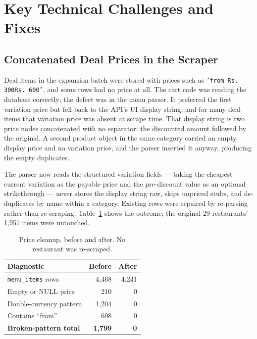 \documentclass[11pt,a4paper]{article}
\newcommand{\code}[1]{\texttt{\small #1}}
\begin{document}
\section{Key Technical Challenges and Fixes}

\subsection{Concatenated Deal Prices in the Scraper}
\label{sec:dealbug}

Deal items in the expansion batch were stored with prices such as
\code{'from Rs. 300Rs. 600'}, and some rows had no price at all. The cart code
was reading the database correctly; the defect was in the menu parser. It
preferred the first variation price but fell back to the API's UI display
string, and for many deal items that variation price was absent at scrape
time. That display string is two price nodes concatenated with no separator:
the discounted amount followed by the original. A second product object in the
same category carried an empty display price and no variation price, and the
parser inserted it anyway, producing the empty duplicates.

The parser now reads the structured variation fields --- taking the cheapest
current variation as the payable price and the pre-discount value as an
optional strikethrough --- never stores the display string raw, skips unpriced
stubs, and de-duplicates by name within a category. Existing rows were
repaired by re-parsing rather than re-scraping. Table~\ref{tab:cleanup} shows
the outcome; the original 29 restaurants' 1{,}957 items were untouched.

\begin{table}[htbp]
\centering
\caption{Price cleanup, before and after. No restaurant was re-scraped.}
\label{tab:cleanup}
\small
\begin{tabular}{@{}l r r@{}}
\toprule
\textbf{Diagnostic} & \textbf{Before} & \textbf{After} \\
\midrule
\code{menu\_items} rows & 4{,}468 & 4{,}241 \\
Empty or NULL price & 210 & 0 \\
Double-currency pattern & 1{,}204 & 0 \\
Contains ``from'' & 608 & 0 \\
\textbf{Broken-pattern total} & \textbf{1{,}799} & \textbf{0} \\
\bottomrule
\end{tabular}
\end{table}
\end{document}
